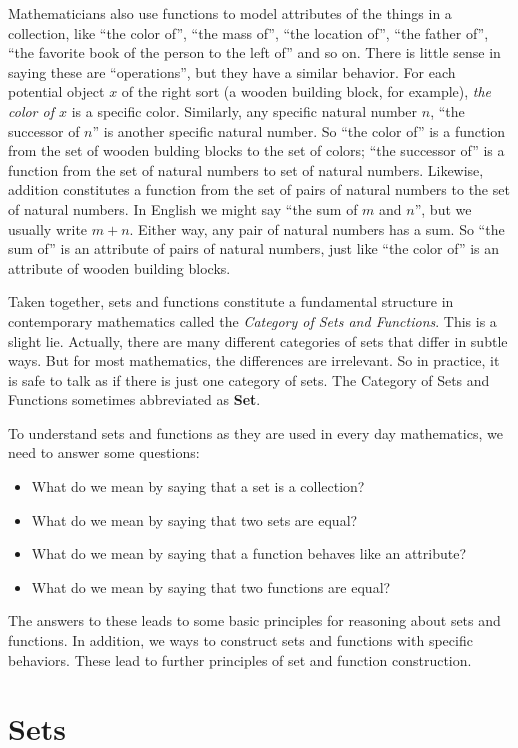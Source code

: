 Mathematicians also use functions to model attributes of the things in a collection, like ``the color of'', ``the mass of'', ``the location of'', ``the father of'', ``the favorite book of the person to the left of'' and so on.
There is little sense in saying these are ``operations'', but they have a similar behavior. For each potential
object $x$ of the right sort (a wooden building block, for example), \emph{the color of $x$} is a specific color. Similarly,
any specific natural number $n$, ``the successor of $n$'' is another specific natural number. So ``the color of'' is a function
from the set of wooden bulding blocks to the set of colors; ``the successor of''
is a function from the set of natural numbers to set of natural numbers. Likewise, addition constitutes a function from the set of 
pairs of natural numbers to the set of natural numbers. In English we might say ``the sum of $m$ and $n$'', but we usually write $m+n$. 
Either way, any pair of natural numbers has a sum. So ``the sum of'' is an attribute of pairs of natural numbers, just like ``the color of'' is an attribute of wooden building blocks.

Taken together, sets and functions constitute a fundamental structure in contemporary mathematics called the \emph{Category of Sets and Functions}. 
This is a slight lie.
Actually, there are many different categories of sets that differ in subtle ways. 
But for most mathematics, the differences are irrelevant.
So in practice, it is safe to talk as if there is just one category of sets.
The Category of Sets and Functions sometimes abbreviated as \textbf{Set}.

To understand sets and functions as they are used in every day mathematics, we need to answer some questions:
\begin{itemize}
	\item What do we mean by saying that a set is a collection?
	\item What do we mean by saying that two sets are equal?
	\item What do we mean by saying that a function behaves like an attribute?
	\item What do we mean by saying that two functions are equal?
\end{itemize}
The answers to these leads to some basic principles for reasoning about sets and functions. 
In addition, we ways to construct sets and functions with specific behaviors. 
These lead to further principles of set and function construction.

\section*{Sets}

